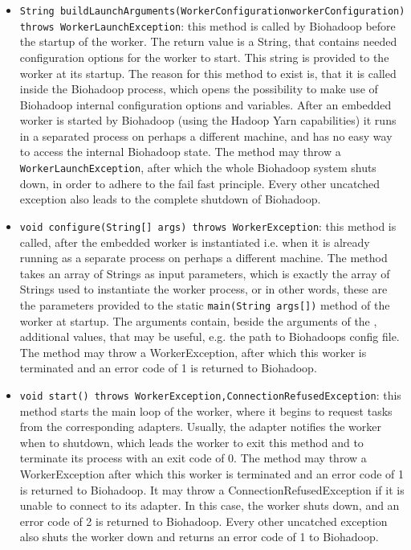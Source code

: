   \begin{itemize}
    \item \texttt{String buildLaunchArguments(WorkerConfiguration\newline workerConfiguration) throws WorkerLaunchException}: this method is called by Biohadoop before the startup of the worker. The return value is a String, that contains needed configuration options for the worker to start. This string is provided to the worker at its startup. The reason for this method to exist is, that it is called inside the Biohadoop process, which opens the possibility to make use of Biohadoop internal configuration options and variables. After an embedded worker is started by Biohadoop (using the Hadoop Yarn capabilities) it runs in a separated process on perhaps a different machine, and has no easy way to access the internal Biohadoop state. The method may throw a \texttt{WorkerLaunchException}, after which the whole Biohadoop system shuts down, in order to adhere to the fail fast principle. Every other uncatched exception also leads to the complete shutdown of Biohadoop.
    \item \texttt{void configure(String[] args) throws WorkerException}: this method is called, after the embedded worker is instantiated i.e. when it is already running as a separate process on perhaps a different machine. The method takes an array of Strings as input parameters, which is exactly the array of Strings used to instantiate the worker process, or in other words, these are the parameters provided to the static \texttt{main(String args[])} method of the worker at startup. The arguments contain, beside the arguments of the , additional values, that may be useful, e.g. the path to Biohadoops config file. The method may throw a WorkerException, after which this worker is terminated and an error code of 1 is returned to Biohadoop.
    \item \texttt{void start() throws WorkerException,\newline ConnectionRefusedException}: this method starts the main loop of the worker, where it begins to request tasks from the corresponding adapters. Usually, the adapter notifies the worker when to shutdown, which leads the worker to exit this method and to terminate its process with an exit code of 0. The method may throw a WorkerException after which this worker is terminated and an error code of 1 is returned to Biohadoop. It may throw a ConnectionRefusedException if it is unable to connect to its adapter. In this case, the worker shuts down, and an error code of 2 is returned to Biohadoop. Every other uncatched exception also shuts the worker down and returns an error code of 1 to Biohadoop.
  \end{itemize}
  
